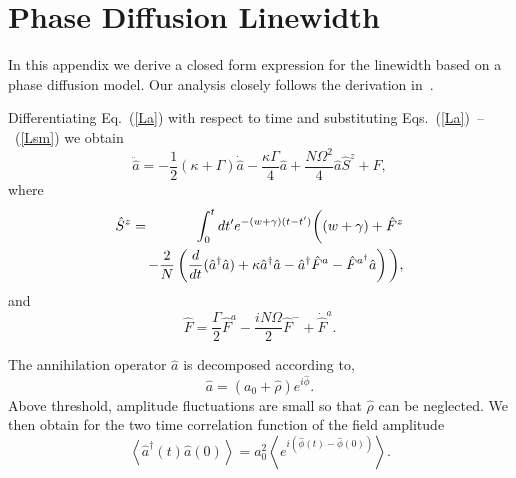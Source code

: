 \documentclass[aps,
twocolumn,
showpacs,
superscriptaddress,groupedaddress]{revtex4}
\begin{document}
\section{Phase Diffusion Linewidth}
\label{HakenAppendix}

In this appendix we derive a closed form expression for the linewidth
based on a phase diffusion model.  Our analysis closely follows the
derivation in~\cite{HakenLaser, HakenLaserBook}.

Differentiating Eq.~(\ref{La}) with respect to time and substituting 
Eqs.~(\ref{La})~--~(\ref{Lsm}) we obtain
\begin{equation}
\ddot{\hat{a}} =
-\frac{1}{2} (\kappa+\Gamma)  \dot{\hat{a}} -
\frac{\kappa \Gamma}{4}\hat{a}  +
\frac{N \Omega^2 }{4} \hat{a} \hat{S}^z +\hat{F},
\label{addeq}
\end{equation}
where
\begin{eqnarray}
\hat{S}^z &=&
\int_0^t dt^{\prime} e^{-(w+\gamma)(t-t^{\prime})}
\bigg( (w+\gamma) + \hat{F}^z
\nonumber
\\
&&\hspace{-3mm}-\frac{2}{N} \left( \frac{d}{dt} (\hat{a}^{\dagger} \hat{a}) +
\kappa \hat{a}^{\dagger} \hat{a} -\hat{a}^{\dagger} \hat{F}^a -
\hat{F}^{a^{\dagger}} \hat{a} \right) \bigg),
\end{eqnarray}
and
\begin{equation}
\hat{F} = \frac{\Gamma}{2} \hat{F}^a-
\frac{i N \Omega}{2} \hat{F}^-+\dot{\hat{F}}^a.
\end{equation}

The annihilation operator $\hat{a}$ is decomposed according to,
\begin{equation}
\hat{a}= (a_0 + \hat{\rho}) e^{i\hat{\phi}}.
\label{adecomp}
\end{equation}
Above threshold, amplitude fluctuations are small so that $\hat\rho$
can be neglected.  We then obtain for the two time correlation function
of the field amplitude
\begin{equation}
\left< \hat{a}^{\dagger}(t) \hat{a}(0) \right> =
a_0^2 \left< e^{i(\hat{\phi}(t) - \hat{\phi}(0))} \right>.
\end{equation}
\end{document}
